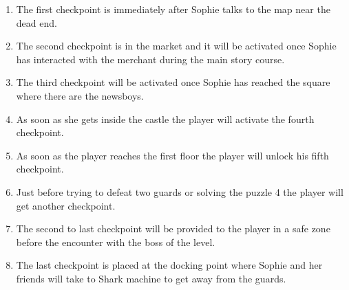 \begin{enumerate}
 \item The first checkpoint is immediately after Sophie talks to the map near the dead end.
 \item The second checkpoint is in the market and it will be activated once Sophie has interacted with the merchant during the main story course.
 \item The third checkpoint will be activated once Sophie has reached the square where there are the newsboys.
 \item As soon as she gets inside the castle the player will activate the fourth checkpoint.
 \item As soon as the player reaches the first floor the player will unlock his fifth checkpoint.
 \item Just before trying to defeat two guards or solving the puzzle 4  the player will get another checkpoint.
 \item The second to last checkpoint will be provided to the player in a safe zone before the encounter with the boss of the level.
 \item The last checkpoint is placed at the docking point where Sophie and her friends will take to Shark machine to get away from the guards.
\end{enumerate}
